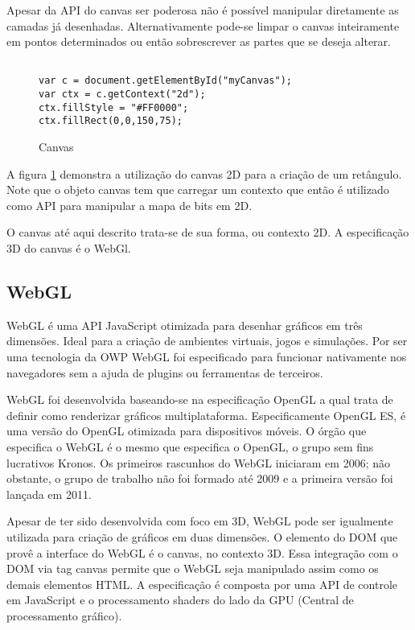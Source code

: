 Apesar da API do canvas ser poderosa não é possível manipular
diretamente as camadas já desenhadas. Alternativamente pode-se limpar
o canvas inteiramente em pontos determinados ou então sobrescrever as
partes que se deseja alterar.

\begin{figure}[H]
\centering
\begin{verbatim}

var c = document.getElementById("myCanvas");
var ctx = c.getContext("2d");
ctx.fillStyle = "#FF0000";
ctx.fillRect(0,0,150,75);

\end{verbatim}
\caption{Canvas}
\label{img:retangleOnCanvas}
\end{figure}

A figura \ref{img:retangleOnCanvas} demonstra a utilização do canvas 2D
para a criação de um retângulo. Note que o objeto canvas tem que carregar um
contexto que então é utilizado como API para manipular a mapa de bits em 2D.

O canvas até aqui descrito trata-se de sua forma, ou contexto 2D. A
especificação 3D do canvas é o WebGl.

\subsection{WebGL}

WebGL é uma API JavaScript otimizada para desenhar gráficos em três
dimensões. Ideal para a criação de ambientes virtuais, jogos e
simulações. Por ser uma tecnologia da OWP WebGL foi especificado
para funcionar nativamente nos navegadores sem a ajuda de plugins ou
ferramentas de terceiros.

WebGL foi desenvolvida baseando-se na especificação OpenGL a
qual trata de definir como renderizar gráficos multiplataforma.
Especificamente OpenGL ES, é uma versão do OpenGL otimizada para
dispositivos móveis. O órgão que especifica o WebGL é o mesmo que
especifica o OpenGL, o grupo sem fins lucrativos Kronos. Os primeiros
rascunhos do WebGL iniciaram em 2006; não obstante, o grupo de trabalho
não foi formado até 2009 e a primeira versão foi lançada em 2011.

Apesar de ter sido desenvolvida com foco em 3D, WebGL pode
ser igualmente utilizada para criação de gráficos em duas
dimensões\autocite[p. 6]{3daps}. O elemento do DOM que provê a
interface do WebGL é o canvas, no contexto 3D. Essa integração com
o DOM via tag canvas permite que o WebGL seja manipulado assim como os
demais elementos HTML. A especificação é composta por uma API de
controle em JavaScript e o processamento shaders do lado da GPU (Central
de processamento gráfico).


